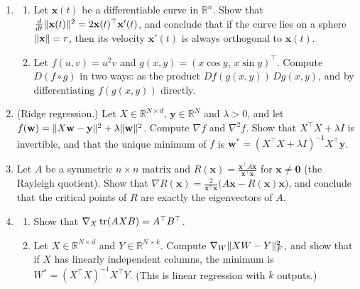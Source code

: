 \begin{enumerate}[leftmargin=*]
\begin{enumerate}[label=(\alph*)]
        \item Show that spherical coordinates $f(r, \theta, \varphi) = (r\sin\theta\cos\varphi, \, r\sin\theta\sin\varphi, \, r\cos\theta)^\top$ have the Jacobian determinant $r^2\sin\theta$. Use the change of variables formula (Remark~\ref{L3-rem:change-of-variables}) to show that the ball of radius $R$ has the volume $\frac{4}{3}\pi R^3$.
    \end{enumerate}
    \item \begin{enumerate}[label=(\alph*)]
        \item Let $\mathbf{x}(t)$ be a differentiable curve in $\mathbb{R}^n$. Show that $\frac{d}{dt}\lVert \mathbf{x}(t) \rVert^2 = 2\mathbf{x}(t)^\top\mathbf{x}'(t)$, and conclude that if the curve lies on a sphere $\lVert \mathbf{x} \rVert = r$, then its velocity $\mathbf{x}'(t)$ is always orthogonal to $\mathbf{x}(t)$.
        \item Let $f(u, v) = u^2 v$ and $g(x, y) = (x\cos y, \, x\sin y)^\top$. Compute $D(f \circ g)$ in two ways: as the product $Df(g(x, y))\,Dg(x, y)$, and by differentiating $f(g(x, y))$ directly.
    \end{enumerate}
    \item \homework{} (Ridge regression.) Let $X \in \mathbb{R}^{N \times d}$, $\mathbf{y} \in \mathbb{R}^N$ and $\lambda > 0$, and let $f(\mathbf{w}) = \lVert X\mathbf{w} - \mathbf{y} \rVert^2 + \lambda\lVert \mathbf{w} \rVert^2$. Compute $\nabla f$ and $\nabla^2 f$. Show that $X^\top X + \lambda I$ is invertible, and that the unique minimum of $f$ is $\mathbf{w}^* = (X^\top X + \lambda I)^{-1}X^\top\mathbf{y}$.
    \item Let $A$ be a symmetric $n \times n$ matrix and $R(\mathbf{x}) = \frac{\mathbf{x}^\top A\mathbf{x}}{\mathbf{x}^\top\mathbf{x}}$ for $\mathbf{x} \neq \mathbf{0}$ (the Rayleigh quotient). Show that $\nabla R(\mathbf{x}) = \frac{2}{\mathbf{x}^\top\mathbf{x}}\big(A\mathbf{x} - R(\mathbf{x})\mathbf{x}\big)$, and conclude that the critical points of $R$ are exactly the eigenvectors of $A$.
    \item \homework{} \begin{enumerate}[label=(\alph*)]
        \item Show that $\nabla_X\operatorname{tr}(AXB) = A^\top B^\top$.
        \item Let $X \in \mathbb{R}^{N \times d}$ and $Y \in \mathbb{R}^{N \times k}$. Compute $\nabla_W\lVert XW - Y \rVert_F^2$, and show that if $X$ has linearly independent columns, the minimum is $W^* = (X^\top X)^{-1}X^\top Y$. (This is linear regression with $k$ outputs.)

\end{enumerate}
\end{enumerate}
